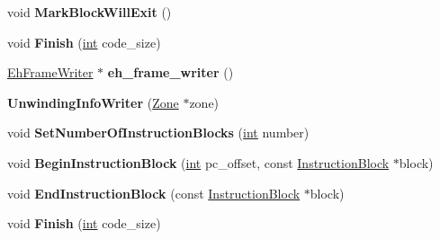 \begin{DoxyCompactItemize}
void {\bfseries Mark\+Block\+Will\+Exit} ()
\item 
\mbox{\label{classv8_1_1internal_1_1compiler_1_1UnwindingInfoWriter_a7dd0336aa10a53ee8dd31c57179c9778}} 
void {\bfseries Finish} (\mbox{\hyperlink{classint}{int}} code\+\_\+size)
\item 
\mbox{\label{classv8_1_1internal_1_1compiler_1_1UnwindingInfoWriter_ae8d9ca300ce739150b15da003ce3e642}} 
\mbox{\hyperlink{classv8_1_1internal_1_1EhFrameWriter}{Eh\+Frame\+Writer}} $\ast$ {\bfseries eh\+\_\+frame\+\_\+writer} ()
\item 
\mbox{\label{classv8_1_1internal_1_1compiler_1_1UnwindingInfoWriter_ab9baf225b2104df264b3cf7b1a5b7cce}} 
{\bfseries Unwinding\+Info\+Writer} (\mbox{\hyperlink{classv8_1_1internal_1_1Zone}{Zone}} $\ast$zone)
\item 
\mbox{\label{classv8_1_1internal_1_1compiler_1_1UnwindingInfoWriter_a5480ac05525eca5283126ea5e3748561}} 
void {\bfseries Set\+Number\+Of\+Instruction\+Blocks} (\mbox{\hyperlink{classint}{int}} number)
\item 
\mbox{\label{classv8_1_1internal_1_1compiler_1_1UnwindingInfoWriter_a4fe6a694e0d3b6d0472459af40eba0ab}} 
void {\bfseries Begin\+Instruction\+Block} (\mbox{\hyperlink{classint}{int}} pc\+\_\+offset, const \mbox{\hyperlink{classv8_1_1internal_1_1compiler_1_1InstructionBlock}{Instruction\+Block}} $\ast$block)
\item 
\mbox{\label{classv8_1_1internal_1_1compiler_1_1UnwindingInfoWriter_afc7ef781f2d55ef125a3dd4697c0164e}} 
void {\bfseries End\+Instruction\+Block} (const \mbox{\hyperlink{classv8_1_1internal_1_1compiler_1_1InstructionBlock}{Instruction\+Block}} $\ast$block)
\item 
\mbox{\label{classv8_1_1internal_1_1compiler_1_1UnwindingInfoWriter_a7dd0336aa10a53ee8dd31c57179c9778}} 
void {\bfseries Finish} (\mbox{\hyperlink{classint}{int}} code\+\_\+size)

\end{DoxyCompactItemize}
